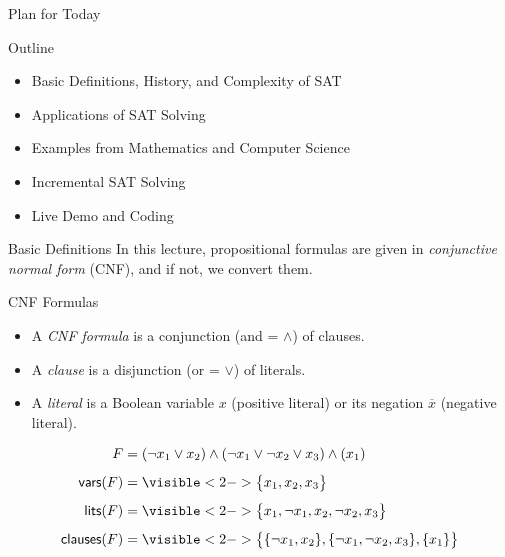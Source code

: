 \documentclass[t]{sdqbeamer}
\begin{document}
\begin{frame}{Plan for Today}
\begin{block}{Outline}
\begin{itemize}\setlength{\itemsep}{1em}
	\item Basic Definitions, History, and Complexity of SAT
	\item Applications of SAT Solving
	\item Examples from Mathematics and Computer Science
	\item Incremental SAT Solving
	\item Live Demo and Coding
\end{itemize}
\end{block}
\end{frame}


\begin{frame}{Basic Definitions}
In this lecture, propositional formulas are given in \emph{conjunctive normal form} (CNF), and if not, we convert them.\\[1em]
\begin{block}{CNF Formulas}
\begin{itemize}
	\item A \emph{CNF formula} is a conjunction (and = $\wedge$) of clauses.
	\item A \emph{clause} is a disjunction (or = $\vee$) of literals.
	\item A \emph{literal} is a Boolean variable $x$ (positive literal) or its negation $\overline{x}$ (negative literal).
\end{itemize}	
\end{block}
\begin{example}
\vspace{-3ex}
\begin{align*}
	F &= (\lnot x_1 \vee x_2) \wedge (\lnot x_1 \vee \lnot x_2 \vee x_3) \wedge (x_1)\\[1ex]
	\vars{F} &= \visible<2->{ \bigl\{ x_1, x_2, x_3 \bigr\} }\\[1ex]
	\lits{F} &= \visible<2->{ \bigl\{ x_1, \lnot x_1, x_2, \lnot x_2, x_3 \bigr\} }\\[1ex]
	\clss{F} &= \visible<2->{ \bigl\{ \{ \lnot x_1, x_2 \}, \{ \lnot x_1, \lnot x_2, x_3 \}, \{ x_1 \} \bigr\} }
\end{align*}
\end{example}
\end{frame}
\end{document}
